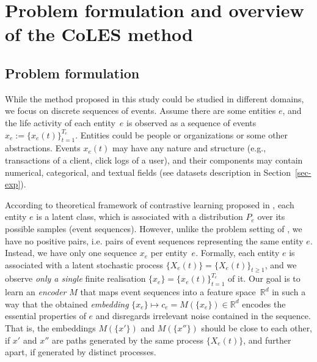\documentclass[sigconf, anonymous]{acmart}
\newcommand{\R}{\mathbb{R}}
\begin{document}

\section{Problem formulation and overview of the CoLES method} \label{sec-method}

\subsection{Problem formulation} \label{sec:problem setting}

While the method proposed in this study could be studied in different domains, we focus on discrete
sequences of events. Assume there are some entities $e$, and the life activity of each entity~$e$ is
observed as a sequence of events $
    x_e := \{x_e(t)\}^{T_e}_{t=1}
$. Entities could be people or organizations or some other abstractions. Events $x_e(t)$ may have
any nature and structure (e.g., transactions of a client, click logs of a user), and their components
may contain numerical, categorical, and textual fields (see datasets description in Section~\ref{sec-exp}). 

According to theoretical framework of contrastive learning proposed in \citep{Saunshi2019ICML}, each
entity $e$ is a latent class, which is associated with a distribution $P_e$ over its possible samples
(event sequences). However, unlike the problem setting of \cite{Saunshi2019ICML}, we have no positive
pairs, i.e. pairs of event sequences representing the same entity $e$. Instead, we have only one
sequence $x_e$ per entity~$e$. Formally, each entity $e$ is associated with a latent stochastic
process $
    \{X_e(t)\} = \{X_e(t)\}_{t\geq 1}
$, and we observe \emph{only a single} finite realisation $
    \{x_e\} = \{x_e(t)\}_{t=1}^{T_e}
$ of it. Our goal is to learn an \emph{encoder} $M$ that maps event sequences into a feature space~$\R^d$
in such a way that the obtained \emph{embedding} $
    \{x_e\} \mapsto c_e = M(\{x_e\}) \in \R^d
$ encodes the essential properties of $e$ and disregards irrelevant noise contained in the sequence.
That is, the embeddings $M(\{x'\})$ and $M(\{x''\})$ should be close to each other, if $x'$ and
$x''$ are paths generated by the same process $\{X_e(t)\}$, and further apart, if generated by distinct
processes.
\end{document}
